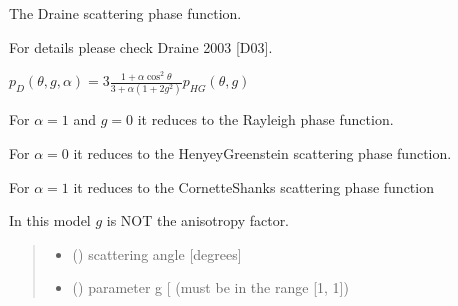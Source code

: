 \documentclass[letterpaper,10pt,english]{sphinxmanual}
\begin{document}

\begin{fulllineitems}
\label{\detokenize{06_anisotropy_factor:skinoptics.anisotropy_factor.ptheta_D}}
\pysigstartsignatures
{}
\pysigstopsignatures
\begin{DUlineblock}{0em}
\item[] The Draine scattering phase function.
\item[] For details please check Draine 2003 {[}D03{]}.
\end{DUlineblock}

\sphinxAtStartPar
\(p_{D}(\theta, g, \alpha) = 3\frac{1 + \alpha \cos^2\theta}{3 + \alpha (1 + 2g^2)} p_{HG}(\theta, g)\)

\begin{DUlineblock}{0em}
\item[] For \(\alpha = 1\) and \(g = 0\) it reduces to the Rayleigh phase function.
\item[] For \(\alpha = 0\) it reduces to the Henyey\sphinxhyphen{}Greenstein scattering phase function.
\item[] For \(\alpha = 1\) it reduces to the Cornette\sphinxhyphen{}Shanks scattering phase function
\end{DUlineblock}

\begin{DUlineblock}{0em}
\item[] In this model \(g\) is NOT the anisotropy factor.
\end{DUlineblock}
\begin{quote}\begin{description}
\begin{itemize}
\item {} 
\sphinxAtStartPar
{} () \textendash{} scattering angle {[}degrees{]}

\item {} 
\sphinxAtStartPar
{} () \textendash{} parameter g {[}\sphinxhyphen{}{]} (must be in the range {[}\sphinxhyphen{}1, 1{]})


\end{itemize}
\end{description}
\end{quote}
\end{fulllineitems}
\end{document}
